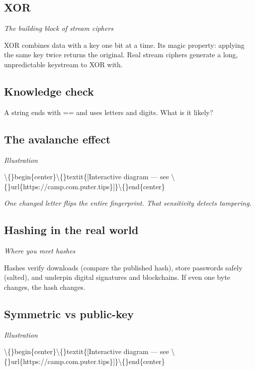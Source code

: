 \documentclass[12pt,openany]{book}
\begin{document}
\medskip

\subsection*{XOR}
{\small\itshape\color{gray}The building block of stream ciphers}


XOR combines data with a key one bit at a time. Its magic property: applying the same key twice returns the original. Real stream ciphers generate a long, unpredictable keystream to XOR with.

\medskip

\subsection*{Knowledge check}

A string ends with == and uses letters and digits. What is it likely?

\medskip

\subsection*{The avalanche effect}
{\small\itshape\color{gray}Illustration}

\textbackslash\{\}begin\{center\}\textbackslash\{\}textit\{[Interactive diagram --- see \textbackslash\{\}url\{https://camp.com.puter.tips\}]\}\textbackslash\{\}end\{center\}

{\small\itshape\color{gray}One changed letter flips the entire fingerprint. That sensitivity detects tampering.}

\medskip

\subsection*{Hashing in the real world}
{\small\itshape\color{gray}Where you meet hashes}


Hashes verify downloads (compare the published hash), store passwords safely (salted), and underpin digital signatures and blockchains. If even one byte changes, the hash changes.

\medskip

\subsection*{Symmetric vs public-key}
{\small\itshape\color{gray}Illustration}

\textbackslash\{\}begin\{center\}\textbackslash\{\}textit\{[Interactive diagram --- see \textbackslash\{\}url\{https://camp.com.puter.tips\}]\}\textbackslash\{\}end\{center\}
\end{document}
